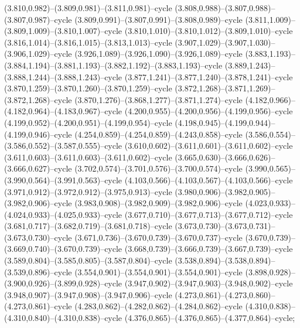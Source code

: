 (3.810,0.982)--(3.809,0.981)--(3.811,0.981)--cycle (3.808,0.988)--(3.807,0.988)--(3.807,0.987)--cycle (3.809,0.991)--(3.807,0.991)--(3.808,0.989)--cycle (3.811,1.009)--(3.809,1.009)--(3.810,1.007)--cycle (3.810,1.010)--(3.810,1.012)--(3.809,1.010)--cycle (3.816,1.014)--(3.816,1.015)--(3.813,1.013)--cycle (3.907,1.029)--(3.907,1.030)--(3.906,1.029)--cycle (3.926,1.089)--(3.926,1.090)--(3.926,1.089)--cycle (3.883,1.193)--(3.884,1.194)--(3.881,1.193)--(3.882,1.192)--(3.883,1.193)--cycle (3.889,1.243)--(3.888,1.244)--(3.888,1.243)--cycle (3.877,1.241)--(3.877,1.240)--(3.878,1.241)--cycle (3.870,1.259)--(3.870,1.260)--(3.870,1.259)--cycle (3.872,1.268)--(3.871,1.269)--(3.872,1.268)--cycle (3.870,1.276)--(3.868,1.277)--(3.871,1.274)--cycle (4.182,0.966)--(4.182,0.964)--(4.183,0.967)--cycle (4.200,0.955)--(4.200,0.956)--(4.199,0.956)--cycle (4.199,0.952)--(4.200,0.951)--(4.199,0.954)--cycle (4.198,0.945)--(4.199,0.944)--(4.199,0.946)--cycle (4.254,0.859)--(4.254,0.859)--(4.243,0.858)--cycle (3.586,0.554)--(3.586,0.552)--(3.587,0.555)--cycle (3.610,0.602)--(3.611,0.601)--(3.611,0.602)--cycle (3.611,0.603)--(3.611,0.603)--(3.611,0.602)--cycle (3.665,0.630)--(3.666,0.626)--(3.666,0.627)--cycle (3.702,0.574)--(3.701,0.576)--(3.700,0.574)--cycle (3.990,0.565)--(3.990,0.564)--(3.991,0.563)--cycle (4.103,0.566)--(4.103,0.567)--(4.103,0.566)--cycle (3.971,0.912)--(3.972,0.912)--(3.975,0.913)--cycle (3.980,0.906)--(3.982,0.905)--(3.982,0.906)--cycle (3.983,0.908)--(3.982,0.909)--(3.982,0.906)--cycle (4.023,0.933)--(4.024,0.933)--(4.025,0.933)--cycle (3.677,0.710)--(3.677,0.713)--(3.677,0.712)--cycle (3.681,0.717)--(3.682,0.719)--(3.681,0.718)--cycle (3.673,0.730)--(3.673,0.731)--(3.673,0.730)--cycle (3.671,0.736)--(3.670,0.739)--(3.670,0.737)--cycle (3.670,0.739)--(3.669,0.740)--(3.670,0.739)--cycle (3.668,0.739)--(3.666,0.739)--(3.667,0.739)--cycle (3.589,0.804)--(3.585,0.805)--(3.587,0.804)--cycle (3.538,0.894)--(3.538,0.894)--(3.539,0.896)--cycle (3.554,0.901)--(3.554,0.901)--(3.554,0.901)--cycle (3.898,0.928)--(3.900,0.926)--(3.899,0.928)--cycle (3.947,0.902)--(3.947,0.903)--(3.948,0.902)--cycle (3.948,0.907)--(3.947,0.908)--(3.947,0.906)--cycle (4.273,0.861)--(4.273,0.860)--(4.273,0.861)--cycle (4.283,0.862)--(4.282,0.862)--(4.284,0.862)--cycle (4.310,0.838)--(4.310,0.840)--(4.310,0.838)--cycle (4.376,0.865)--(4.376,0.865)--(4.377,0.864)--cycle;
